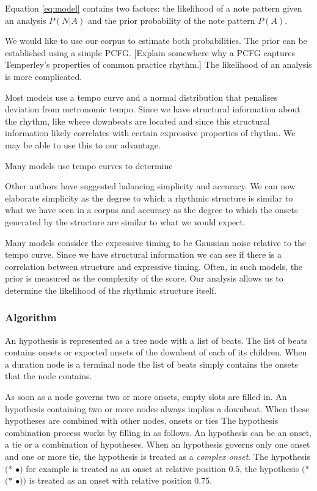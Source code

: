 Equation \ref{eq:model} contains two factors: the likelihood of a note pattern given an analysis $P(N|A)$ and the prior probability of the note pattern $P(A)$. 

We would like to use our corpus to estimate both probabilities. The prior can be established using a simple PCFG. [Explain somewhere why a PCFG captures Temperley's properties of common practice rhythm.] The likelihood of an analysis is more complicated.

Most models use a tempo curve and a normal distribution that penalises deviation from metronomic tempo. Since we have structural information about the rhythm, like where downbeats are located and since this structural information likely correlates with certain expressive properties of rhythm. We may be able to use this to our advantage. 

Many models use tempo curves to determine

Other authors have suggested balancing simplicity and accuracy. We can now elaborate simplicity as the degree to which a rhythmic structure is similar to what we have seen in a corpus and accuracy as the degree to which the onsets generated by the structure are similar to what we would expect.

Many models consider the expressive timing to be Gaussian noise relative to the tempo curve. Since we have structural information we can see if there is a correlation between structure and expressive timing. Often, in such models, the prior is measured as the complexity of the score. Our analysis allows us to determine the likelihood of the rhythmic structure itself. 



\subsubsection{Algorithm}


An hypothesis is represented as a tree node with a list of beats. The list of beats contains onsets or expected onsets of the downbeat of each of its children. When a duration node is a terminal node the list of beats simply contains the onsets that the node contains.

As soon as a node governs two or more onsets, empty slots are filled in. An hypothesis containing two or more nodes always implies a downbeat. When these hypotheses are combined with other nodes, onsets or ties
The hypothesis combination process works by filling in as follows. An hypothesis can be an onset, a tie or a combination of hypotheses. When an hypothesis governs only one onset and one or more tie, the hypothesis is treated as a \textit{complex onset}. The hypothesis $(*$ $\bullet)$ for example is treated as an onset at relative position $0.5$, the hypothesis $(*$ $(*$ $\bullet))$ is treated as an onset with relative position 0.75.

